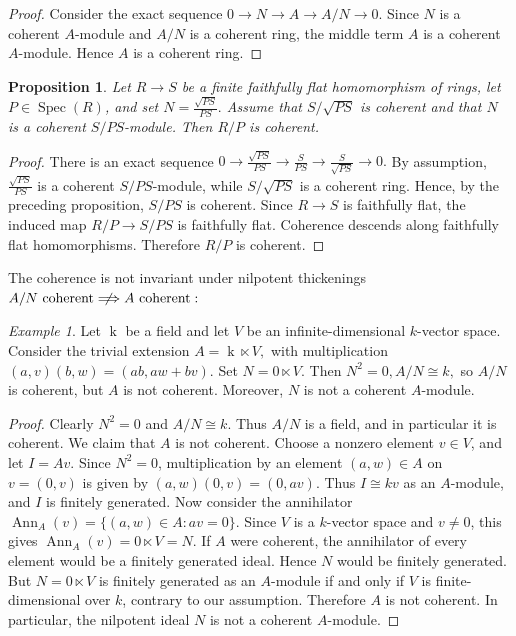 \documentclass[10pt,a4paper]{amsart}
\newtheorem{proposition}[theorem]{Proposition}
\theoremstyle{definition}
\theoremstyle{remark}
\newtheorem{example}[theorem]{Example}
\newcommand{\kk}{\operatorname{k}}
\begin{document}
\begin{proof}
	Consider the exact sequence
$
	0\to N\to A\to A/N
	\to 0.
	$ 	Since \(N\) is a coherent \(A\)-module and \(A/N\) is a coherent ring,
	the middle term \(A\) is a coherent \(A\)-module. Hence \(A\) is a
	coherent ring.
\end{proof}

\begin{proposition}
	Let \(R\to S\) be a finite faithfully flat homomorphism of
	rings, let \(P\in\operatorname{Spec}(R)\), and set
 $
	N=\frac{\sqrt{PS}}{PS}.
	$ 	Assume that \(S/\sqrt{PS}\) is coherent and that \(N\) is a coherent
	\(S/PS\)-module. Then \(R/P\) is coherent.
\end{proposition}

\begin{proof}
	There is an exact sequence	
 $
	0\to
	\frac{\sqrt{PS}}{PS}
	\to
	\frac{S}{PS}
	\to
	\frac{S}{\sqrt{PS}}
	\to 0.
	$ By assumption,
$
	\frac{\sqrt{PS}}{PS}
	$ is a coherent \(S/PS\)-module, while
$
	S/\sqrt{PS}
	$ is a coherent ring. Hence, by the preceding proposition,
$
	S/PS
	$ is coherent.
	Since \(R\to S\) is faithfully flat, the induced map
$
	R/P\to S/PS
	$ 	is faithfully flat. Coherence descends along faithfully flat
	homomorphisms. Therefore \(R/P\) is coherent.
\end{proof}
The coherence is not invariant under nilpotent
thickenings $
A/N\text{ coherent}
\centernot\Longrightarrow
A\text{ coherent}:
$
\begin{example}
	Let \(\kk\) be a field and let \(V\) be an infinite-dimensional
	\(k\)-vector space. Consider the trivial extension
$
	A=\kk\ltimes V,
	$ with multiplication
$
	(a,v)(b,w)=(ab,aw+bv).
$
Set
$
	N=0\ltimes V.
	$ Then
 $
	N^2=0, A/N\cong k,
	$ so \(A/N\) is coherent, but \(A\) is not coherent.
	Moreover, \(N\) is not a coherent \(A\)-module.
\end{example}

\begin{proof}
	Clearly
$
	N^2=0
	$ and
$
	A/N\cong k.
	$ Thus \(A/N\) is a field, and in particular it is coherent.
 We claim that \(A\) is not coherent. Choose a nonzero element
	\(v\in V\), and let
 $
	I=Av.
	$
Since \(N^2=0\), multiplication by an element
	\((a,w)\in A\) on \(v=(0,v)\) is given by
$
	(a,w)(0,v)=(0,av).
$
Thus
$
	I\cong kv
$
as an \(A\)-module, and \(I\) is finitely generated.
Now consider the annihilator
$
	\operatorname{Ann}_A(v)
	=
	\{(a,w)\in A:av=0\}.
	$	Since \(V\) is a \(k\)-vector space and \(v\neq0\), this gives
$
	\operatorname{Ann}_A(v)=0\ltimes V=N.
	$	If \(A\) were coherent, the annihilator of every element would be a
	finitely generated ideal. Hence \(N\) would be finitely generated.
But \(N=0\ltimes V\) is finitely generated as an \(A\)-module if and
	only if \(V\) is finite-dimensional over \(k\), contrary to our
	assumption. Therefore \(A\) is not coherent.
	In particular, the nilpotent ideal \(N\) is not a coherent
	\(A\)-module.
\end{proof}
\end{document}
